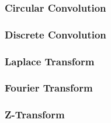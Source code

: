 \documentclass[12pt]{extarticle}
\begin{document}
\subsubsection*{Circular Convolution}
\subsubsection*{Discrete Convolution}
\subsubsection*{Laplace Transform}
\subsubsection*{Fourier Transform}
\subsubsection*{Z-Transform}

\end{document}
